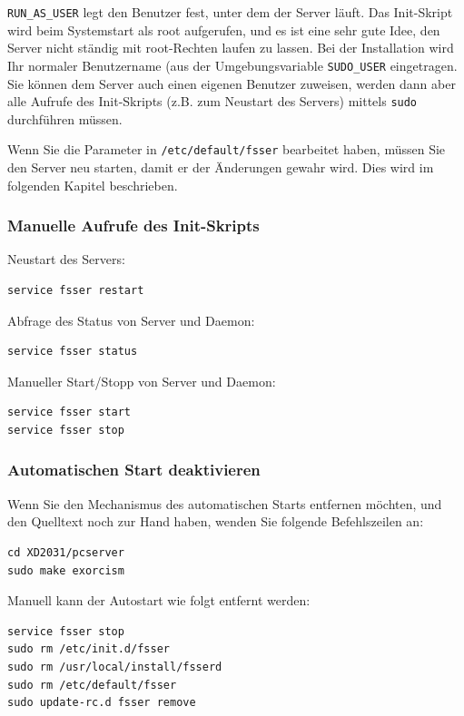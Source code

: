 \documentclass[10pt,a4paper]{scrartcl}		%
\begin{document}
\texttt{RUN\_AS\_USER}  legt den Benutzer fest,
unter dem der Server läuft.
Das Init-Skript wird beim Systemstart als root aufgerufen, und es ist
eine sehr gute Idee, den Server nicht ständig mit root-Rechten laufen zu lassen.
Bei der Installation wird Ihr normaler Benutzername (aus der
Umgebungsvariable \texttt{SUDO\_USER} eingetragen. Sie können dem Server
auch einen eigenen Benutzer zuweisen, werden dann aber alle Aufrufe des
Init-Skripts (z.B. zum Neustart des Servers) mittels \texttt{sudo}
durchführen müssen.

Wenn Sie die Parameter in \texttt{/etc/default/fsser} bearbeitet haben,
müssen Sie den Server neu starten, damit er der Änderungen gewahr wird. Dies
wird im folgenden Kapitel beschrieben.

\subsubsection*{Manuelle Aufrufe des Init-Skripts}
Neustart des Servers:

\begin{verbatim}
service fsser restart
\end{verbatim}

Abfrage des Status von Server und Daemon:

\begin{verbatim}
service fsser status
\end{verbatim}

Manueller Start/Stopp von Server und Daemon:

\begin{verbatim}
service fsser start
service fsser stop
\end{verbatim}

\subsubsection*{Automatischen Start deaktivieren}
Wenn Sie den Mechanismus des automatischen Starts entfernen möchten,
und den Quelltext noch zur Hand haben, wenden Sie folgende Befehlszeilen an:

\begin{verbatim}
cd XD2031/pcserver
sudo make exorcism
\end{verbatim}

Manuell kann der Autostart wie folgt entfernt werden:

\begin{verbatim}
service fsser stop
sudo rm /etc/init.d/fsser
sudo rm /usr/local/install/fsserd
sudo rm /etc/default/fsser
sudo update-rc.d fsser remove
\end{verbatim}
\end{document}
